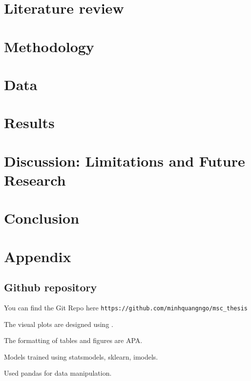 \documentclass[a4paper,11pt]{article}
\begin{document}
\section{Literature review} \label{sec:litrev}
	
\section{Methodology} \label{sec:method}
    
\section{Data} \label{sec:data}
    
\section{Results} \label{sec:results}
	
\section{Discussion: Limitations and Future Research} \label{sec:discussion}
	
\section{Conclusion} \label{sec:conclusion}
	

\newpage
 
 

\newpage
\appendix
\section{Appendix} \label{sec:appendix}
\subsection{Github repository}
You can find the Git Repo here \texttt{https://github.com/minhquangngo/msc\_thesis}

The visual plots are designed using .

The formatting of tables and figures are APA.

Models trained using statsmodels, sklearn, imodels.

Used pandas for data manipulation.


\end{document}
